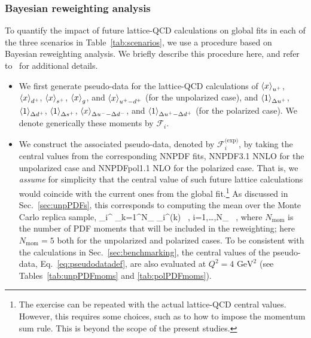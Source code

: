\subsubsection{Bayesian reweighting analysis}
\label{sec:projections:rw}

To quantify the impact of future lattice-QCD calculations on global fits 
in each of the three scenarios in Table~\ref{tab:scenarios},
we use a procedure based on Bayesian reweighting analysis.
%
We briefly describe this procedure here, and refer 
to~\cite{Ball:2011gg,Ball:2010gb} for additional details.

\begin{itemize}

\item We first generate pseudo-data for the lattice-QCD calculations
of $\left\langle x\right\rangle_{u^+}$, $\left\langle x\right\rangle_{d^+}$, $\left\langle x\right\rangle_{s^+}$,
$\left\langle x\right\rangle_{g}$, and $\left\langle x\right\rangle_{u^+-d^+}$ (for the unpolarized case), and
$\left\langle 1\right\rangle_{\Delta u^+}$, $\left\langle 1\right\rangle_{\Delta d^+}$,
$\left\langle 1\right\rangle_{\Delta s^+}$, $\left\langle x\right\rangle_{\Delta u^--\Delta d^-}$, and
$\left\langle 1\right\rangle_{\Delta u^+ - \Delta d^+}$ (for the polarized case).
%
We denote generically these moments by $\mathcal{F}_i$.
  
\item We construct the associated pseudo-data, denoted by 
$\mathcal{F}_i^\text{(exp)}$, by taking the central values from
the corresponding NNPDF fits, NNPDF3.1 NNLO for the unpolarized case and 
NNPDFpol1.1 NLO for the polarized case.
%
That is, we {\it assume} for simplicity that the central value
of such future lattice calculations would coincide with the current ones
from the global fit.\footnote{ The exercise can be repeated
 with the actual lattice-QCD central values. However, this 
 requires some choices, such as to how to impose 
 the momentum sum rule.
 This is beyond the scope of the present studies.}
%
As discussed in Sec.~\ref{sec:unpPDFs}, this corresponds to computing
the mean over the Monte Carlo replica sample,
\be
\label{eq:pseudodatadef}
_i^ \equiv {}\sum_{k=1}^{N_}
_i^{(k)} \, , \quad i=1,\ldots,N_ \, ,
\ee
where $N_\text{mom}$ is the number of PDF moments that will be included
in the reweighting; here $N_\text{mom}=5$ both for the unpolarized and 
polarized cases.
%
To be consistent with the calculations in Sec.~\ref{sec:benchmarking},
the central values of the pseudo-data, Eq.~\eqref{eq:pseudodatadef},
are also evaluated at $Q^2=4\text{ GeV}^2$ 
(see Tables~\ref{tab:unpPDFmoms} and \ref{tab:polPDFmoms}).


\end{itemize}
